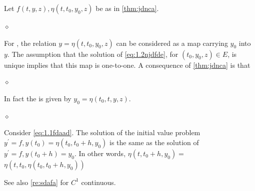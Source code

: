 \documentclass{article}
\begin{document}
\begin{rema}\label{re:jmdfafdaa}
Let $f(t, y, z), \eta\left(t, t_{0}, y_{0}, z\right)$ be as in \cref{thm:jdnca}. 

$\diamond$ 

For , the relation $y=\eta\left(t, t_{0}, y_{0}, z\right)$ can be considered as a map carrying $y_{0}$ into $y$. The assumption that the solution of \cref{eq:1.2njdfde}, for $\left(t_{0}, y_{0}, z\right) \in E$, is unique implies that this map is one-to-one.  A consequence of \cref{thm:jdnca} is that 

$\diamond$ 

In fact the  is given by $y_{0}=\eta\left(t_{0}, t, y, z\right)$. 

$\diamond$ 

Consider \cref{eq:1.1fdaad}. The solution of the initial value problem $y^{\prime}=f, y\left(t_{0}\right)=\eta\left(t_{0}, t_{0}+h, y_{0}\right)$ is the same as the solution of $y^{\prime}=f, y\left(t_{0}+h\right)=y_{0}$. In other words,  $\eta\left(t, t_{0}+h, y_{0}\right)=$ $\eta\left(t, t_{0}, \eta\left(t_{0}, t_{0}+h, y_{0}\right)\right)$

See also \cref{re:sdafa} for $C^1$ continuous.
\end{rema}
\end{document}
